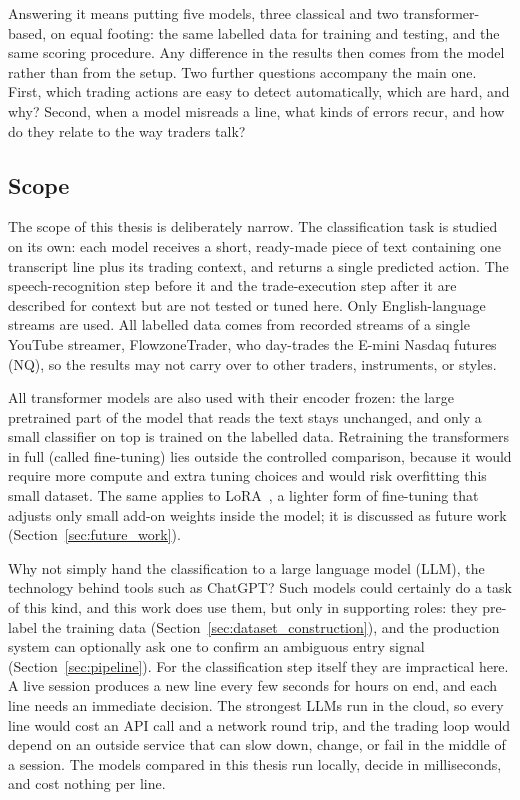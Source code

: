 Answering it means putting five models, three classical and two transformer-based, on equal footing: the same labelled data for training and testing, and the same scoring procedure. Any difference in the results then comes from the model rather than from the setup. Two further questions accompany the main one. First, which trading actions are easy to detect automatically, which are hard, and why? Second, when a model misreads a line, what kinds of errors recur, and how do they relate to the way traders talk?

\subsection{Scope}
\label{sec:scope}

The scope of this thesis is deliberately narrow. The classification task is studied on its own: each model receives a short, ready-made piece of text containing one transcript line plus its trading context, and returns a single predicted action. The speech-recognition step before it and the trade-execution step after it are described for context but are not tested or tuned here. Only English-language streams are used. All labelled data comes from recorded streams of a single YouTube streamer, FlowzoneTrader, who day-trades the E-mini Nasdaq futures (NQ), so the results may not carry over to other traders, instruments, or styles.

All transformer models are also used with their encoder frozen: the large pretrained part of the model that reads the text stays unchanged, and only a small classifier on top is trained on the labelled data. Retraining the transformers in full (called fine-tuning) lies outside the controlled comparison, because it would require more compute and extra tuning choices and would risk overfitting this small dataset. The same applies to LoRA~\cite{hu2021lora}, a lighter form of fine-tuning that adjusts only small add-on weights inside the model; it is discussed as future work (Section~\ref{sec:future_work}).

Why not simply hand the classification to a large language model (LLM), the technology behind tools such as ChatGPT? Such models could certainly do a task of this kind, and this work does use them, but only in supporting roles: they pre-label the training data (Section~\ref{sec:dataset_construction}), and the production system can optionally ask one to confirm an ambiguous entry signal (Section~\ref{sec:pipeline}). For the classification step itself they are impractical here. A live session produces a new line every few seconds for hours on end, and each line needs an immediate decision. The strongest LLMs run in the cloud, so every line would cost an API call and a network round trip, and the trading loop would depend on an outside service that can slow down, change, or fail in the middle of a session. The models compared in this thesis run locally, decide in milliseconds, and cost nothing per line.


